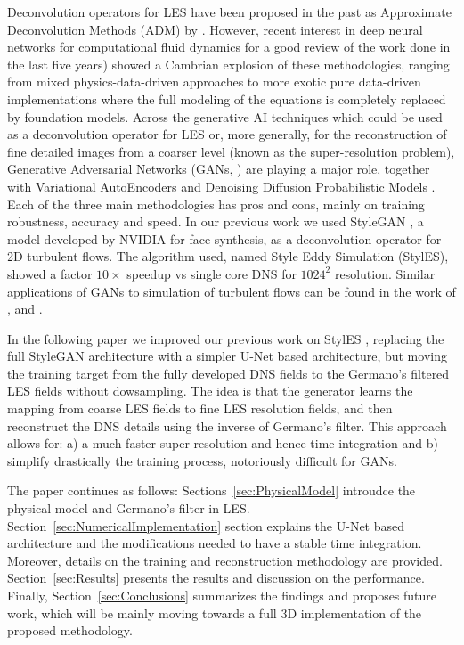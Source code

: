 \documentclass[authoryear,preprint,review,12pt]{elsarticle}
\begin{document}
Deconvolution operators for LES have been proposed in the past as Approximate Deconvolution Methods (ADM) by \citet{stolz_approximate_1999}. However, recent interest in deep neural networks for computational fluid dynamics \citep{wang_recent_2024} for a good review of the work done in the last five years) showed a Cambrian explosion of these methodologies, ranging from mixed physics-data-driven approaches to more exotic pure data-driven implementations where the full modeling of the equations is completely replaced by foundation models. Across the generative AI techniques which could be used as a deconvolution operator for LES or, more generally, for the reconstruction of fine detailed images from a coarser level (known as the super-resolution problem), Generative Adversarial Networks (GANs, \citealp{goodfellow_generative_2014}) are playing a major role, together with Variational AutoEncoders \citep{kingma_auto-encoding_2022} and Denoising Diffusion Probabilistic Models \citep{ho_denoising_2020}. Each of the three main methodologies has pros and cons, mainly on training robustness, accuracy and speed. In our previous work \citep{castagna_stylegan_2024} we used StyleGAN \citep{karras_style-based_2019}, a model developed by NVIDIA for face synthesis, as a deconvolution operator for 2D turbulent flows. The algorithm used, named Style Eddy Simulation (StylES), showed a factor $10\times$ speedup vs single core DNS for $1024^2$ resolution. Similar applications of GANs to simulation of turbulent flows can be found in the work of \citet{kim_deep_2020}, \citet{kim_unsupervised_2021} and \citet{bode_using_2021}.

In the following paper we improved our previous work on StylES \citep{castagna_stylegan_2024}, replacing the full StyleGAN architecture with a simpler U-Net based architecture, but moving the training target from the fully developed DNS fields to the Germano's filtered LES fields without dowsampling. 
The idea is that the generator learns the mapping from coarse LES fields to fine LES resolution fields, and then reconstruct the DNS details using the inverse of Germano's filter. This approach allows for: a) a much faster super-resolution and hence time integration and b) simplify drastically the training process, notoriously difficult for GANs.

The paper continues as follows: Sections~\ref{sec:PhysicalModel} introudce the physical model and Germano's filter in LES. Section~\ref{sec:NumericalImplementation} section explains the U-Net based architecture and the modifications needed to have a stable time integration. Moreover, details on the training and reconstruction methodology are provided. Section~\ref{sec:Results} presents the results and discussion on the performance. Finally, Section~\ref{sec:Conclusions} summarizes the findings and proposes future work, which will be mainly moving towards a full 3D implementation of the proposed methodology.
\end{document}
